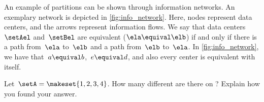 \begin{example}
    An example of partitions can be shown through information networks.
    An exemplary network is depicted in \cref{fig:info_network}.
    Here, nodes represent data centers, and the arrows represent information flows.
    We say that data centers~$\setAel$ and~$\setBel$ are equivalent ($\ela\equival \elb$) if and only if there is a path from~$\ela$ to~$\elb$ and a path from~$\elb$ to~$\ela$.
    In \cref{fig:info_network}, we have that~$a\equival b$,~$e\equival d$, and also every center is equivalent with itself.
\end{example}

\vfill
\begin{gradedexercise}
    \label{ex:CountingEquivalenceRelations}
    Let~$\setA = \makeset{ 1, 2, 3, 4 }$.
    How many different  are there on \setA?
    Explain how you found your answer.
\end{gradedexercise}



